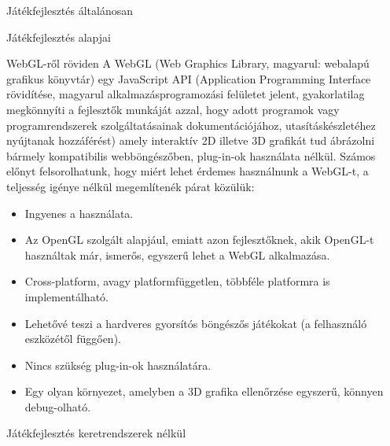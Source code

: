\begin{MyChapter}{Játékfejlesztés általánosan}
\begin{MySection}{Játékfejlesztés alapjai}
		\begin{MySubSection}{WebGL-ről röviden}
			A WebGL (Web Graphics Library, magyarul: webalapú grafikus könyvtár) egy JavaScript API (Application Programming Interface rövidítése, magyarul alkalmazásprogramozási felületet jelent, gyakorlatilag megkönnyíti a fejlesztők munkáját azzal, hogy adott programok vagy programrendszerek szolgáltatásainak dokumentációjához, utasításkészletéhez nyújtanak hozzáférést) amely interaktív 2D illetve 3D grafikát tud ábrázolni bármely kompatibilis webböngészőben, plug-in-ok használata nélkül.
			Számos előnyt felsorolhatunk, hogy miért lehet érdemes használnunk a WebGL-t, a teljesség igénye nélkül megemlítenék párat közülük:
			\begin{itemize}
				\item Ingyenes a használata.
				\item Az OpenGL szolgált alapjául, emiatt azon fejlesztőknek, akik OpenGL-t használtak már, ismerős, egyszerű lehet a WebGL alkalmazása. 
				\item Cross-platform, avagy platformfüggetlen, többféle platformra is implementálható.
				\item Lehetővé teszi a hardveres gyorsítós böngészős játékokat (a felhasználó eszközétől függően).
				\item Nincs szükség plug-in-ok használatára.
				\item Egy olyan környezet, amelyben a 3D grafika ellenőrzése egyszerű, könnyen debug-olható.
				
			\end{itemize}
		\end{MySubSection}
	\end{MySection}

	\begin{MySection}{Játékfejlesztés keretrendszerek nélkül}
	\end{MySection}


\end{MyChapter}
